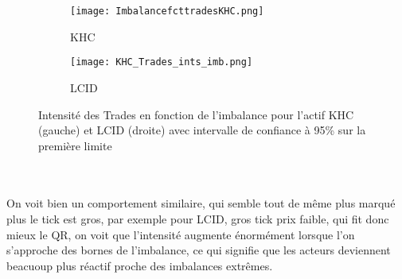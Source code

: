 \documentclass[12pt,a4paper]{article}
\theoremstyle{definition}
\theoremstyle{remark}
\begin{document}
\begin{figure}[h!]
    \centering
    \begin{subfigure}[b]{0.48\textwidth}
        \centering
        \texttt{[image: ImbalancefcttradesKHC.png]}
        \caption{KHC}
        \label{fig:imbalance}
    \end{subfigure}
    \hfill
    \begin{subfigure}[b]{0.48\textwidth}
        \centering
        \texttt{[image: KHC\_Trades\_ints\_imb.png]}
        \caption{LCID}
        \label{fig:densite_imbalance}
    \end{subfigure}
    \caption{Intensité des Trades en fonction de l'imbalance pour l'actif KHC (gauche) et LCID (droite) avec intervalle de confiance à 95\% sur la première limite}
    \label{fig:comparison}
\end{figure}
\\
\\
On voit bien un comportement similaire, qui semble tout de même plus marqué plus le tick est gros, par exemple pour LCID, gros tick prix faible, qui fit donc mieux le QR, on voit que l'intensité augmente énormément lorsque l'on s'approche des bornes de l'imbalance, ce qui signifie que les acteurs deviennent beacuoup plus réactif proche des imbalances extrêmes.
\end{document}
